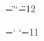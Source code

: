 









\chardef\dblcode=\catcode`\"	%
\catcode`\"=12			%

\chardef\atcode=\catcode`\@	%
\catcode`\@=11			%



